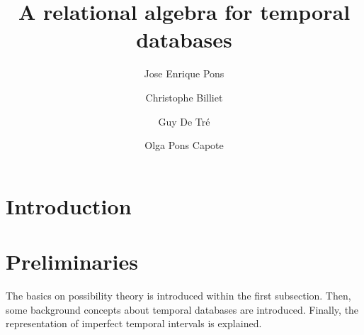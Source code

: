 \documentclass{llncs}
\begin{document}
\mainmatter              %
%
\title{A relational algebra for temporal databases}
%
%
\author{Jose Enrique Pons \and Christophe Billiet \and Guy De Tr\'e \and Olga Pons Capote }

%
%
%

\maketitle              %

\begin{abstract}

%

\end{abstract}

%
\section{Introduction}

%


%
\section{\label{sec:preliminaries}Preliminaries}
The basics on possibility theory is introduced within the first subsection. Then, some background concepts about temporal databases are introduced. Finally, the representation of imperfect temporal intervals is explained.

\end{document}
